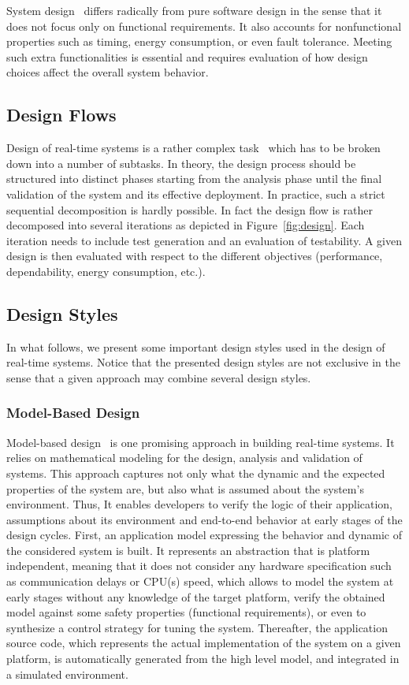 System design~\cite{intro:sys_design} differs radically from pure software design in the sense
that it does not focus only on functional requirements. It also accounts for nonfunctional 
properties such as timing, energy consumption, or even fault tolerance. Meeting such 
extra functionalities is essential and requires evaluation of how design choices affect 
the overall system behavior. 

\subsection{Design Flows}
Design of real-time systems is a rather complex task~\cite{intro:sys_design2} which has to be 
broken down into a number of subtasks. In theory, the design process should be structured into
distinct phases starting from the analysis phase until the final validation of the system and 
its effective deployment. In practice, such a strict sequential decomposition 
is hardly possible.
In fact the design flow is rather decomposed into several iterations as depicted in 
Figure~\ref{fig:design}. Each iteration needs to include test generation and an evaluation 
of testability. A given design is then evaluated with respect to the different objectives 
(performance, dependability, energy consumption, etc.). 


\subsection{Design Styles}

In what follows, we present some important design styles used in the design of real-time systems.
Notice that the presented design styles are not exclusive in the sense that a given approach
may combine several design styles.

\subsubsection{Model-Based Design}
Model-based design~\cite{intro:mb,intro:mb2} is one promising approach in building 
real-time systems. It relies on mathematical modeling for the design, analysis 
and validation of systems. This approach captures not only what the dynamic and the 
expected properties of the system are, but also what is assumed about the system's environment.
Thus, It enables developers to verify the logic of their
application, assumptions about its environment and end-to-end behavior at early stages of the
design cycles.
First, an application model expressing the behavior and dynamic of the considered system is 
built. It represents an abstraction that is platform independent, meaning that it does not 
consider any hardware specification such as communication delays or CPU(s) speed, which allows 
to model the system at early stages without any knowledge of the target platform, 
verify the obtained model against some safety properties (functional requirements), or even
to synthesize a control strategy for tuning the system.
Thereafter, the application source code, which represents the actual 
implementation of the system on a given platform, is automatically generated from the high 
level model, and integrated in a simulated environment. 

